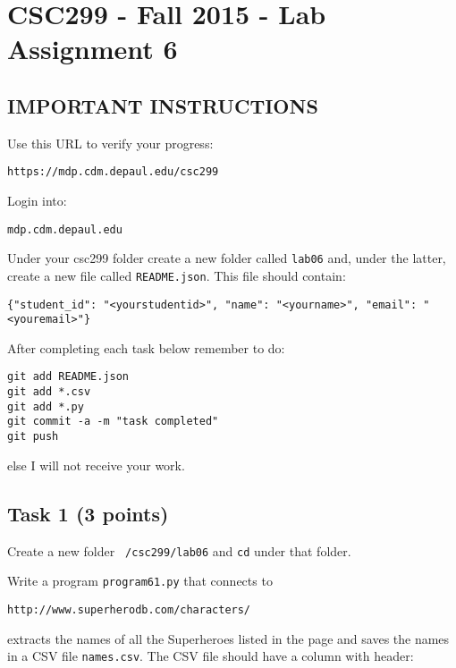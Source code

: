 \documentclass[12pt]{article}
\begin{document}
\section{CSC299 - Fall 2015 - Lab Assignment 6}

\subsection*{IMPORTANT INSTRUCTIONS}

\noindent Use this URL to verify your progress:
\begin{verbatim}
https://mdp.cdm.depaul.edu/csc299
\end{verbatim}

\noindent Login into:
\begin{verbatim}
mdp.cdm.depaul.edu
\end{verbatim}

\noindent Under your csc299 folder create a new folder called {\tt lab06} and, under the latter, create a new file called {\tt README.json}. This file should contain:

\begin{verbatim}
{"student_id": "<yourstudentid>", "name": "<yourname>", "email": "<youremail>"}
\end{verbatim}

\noindent After completing each task below remember to do:

\begin{verbatim}
git add README.json
git add *.csv
git add *.py
git commit -a -m "task completed"
git push
\end{verbatim}

\noindent  else I will not receive your work.

\subsection{Task 1 (3 points)}

\noindent  Create a new folder {\tt ~/csc299/lab06} and {\tt cd} under that folder.

\noindent Write a program {\tt program61.py} that connects to 

\begin{verbatim}
http://www.superherodb.com/characters/
\end{verbatim}

extracts the names of all the Superheroes listed in the page and
saves the names in a CSV file {\tt names.csv}. The CSV file should have a column with header:
\end{document}
